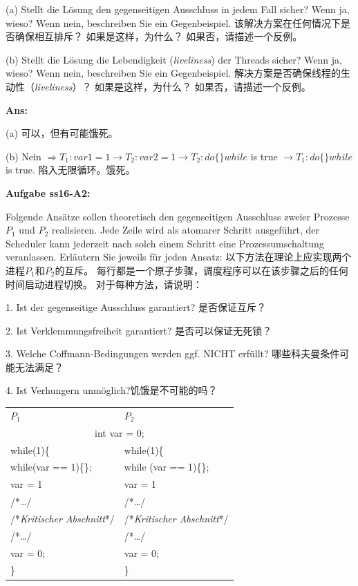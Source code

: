 \documentclass[fleqn]{article}
\begin{document}
(a) Stellt die Lösung den gegenseitigen Ausschluss in jedem Fall sicher? Wenn ja, wieso? Wenn nein, beschreiben Sie ein Gegenbeispiel.
该解决方案在任何情况下是否确保相互排斥？ 如果是这样，为什么？ 如果否，请描述一个反例。

(b) Stellt die Lösung die Lebendigkeit (\textit{liveliness}) der Threads sicher? Wenn ja, wieso? Wenn nein, beschreiben Sie ein Gegenbeispiel.
解决方案是否确保线程的生动性（\textit {liveliness}）？ 如果是这样，为什么？ 如果否，请描述一个反例。

\textbf{Ans:}

(a) 可以，但有可能饿死。

(b) Nein $\Rightarrow T_1: var1 = 1\rightarrow T_2: var2 = 1\rightarrow T_2: do \{\}while$ is true $\rightarrow T_1: do\{\}while$ is true. 陷入无限循环。饿死。

\noindent\textbf{Aufgabe ss16-A2:}

Folgende Ansätze sollen theoretisch den gegenseitigen Ausschluss zweier Prozesse $P_1$ und $P_2$ realisieren. Jede Zeile wird als atomarer Schritt ausgeführt, der Scheduler kann jederzeit nach solch einem Schritt eine Prozessumschaltung veranlassen. Erläutern Sie jeweils für jeden Ansatz:
以下方法在理论上应实现两个进程$ P_1 $和$ P_2 $的互斥。 每行都是一个原子步骤，调度程序可以在该步骤之后的任何时间启动进程切换。 对于每种方法，请说明：

1. Ist der gegenseitige Ausschluss garantiert? 是否保证互斥？

2. Ist Verklemmungsfreiheit garantiert? 是否可以保证无死锁？

3. Welche Coffmann-Bedingungen werden ggf. NICHT erfüllt? 哪些科夫曼条件可能无法满足？

4. Ist Verhungern unmöglich?饥饿是不可能的吗？

\begin{center}
    \begin{tabular}{l|l}
        $P_1$&$P_2$\\
        \multicolumn{2}{c}{int var = 0;}\\
        while(1)\{&while(1)\{\\
        \qquad while(var == 1)\{\};&\qquad while (var == 1)\{\};\\
        \qquad var = 1&\qquad var = 1\\
        \qquad /*\dots*/&\qquad /*\dots*/\\
        \qquad /*\textit{Kritischer Abschnitt}*/&\qquad /*\textit{Kritischer Abschnitt}*/\\
        \qquad /*\dots*/&\qquad /*\dots*/\\
        \qquad var = 0;&\qquad var = 0;\\
        \}&\}
    \end{tabular}
\end{center}
\end{document}
